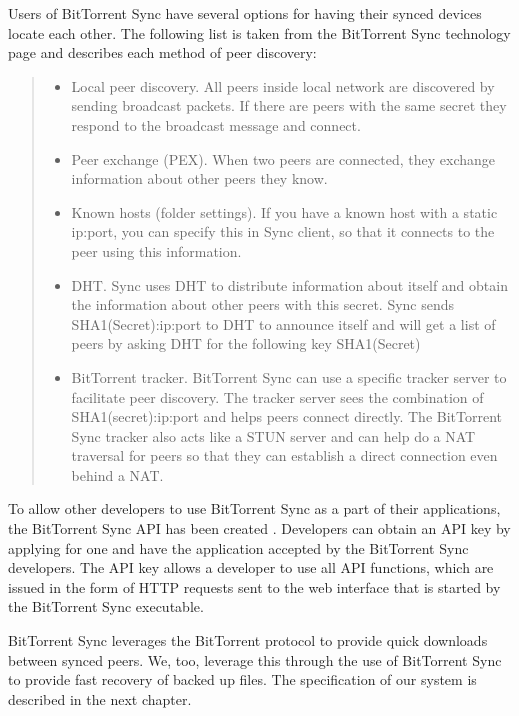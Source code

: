 \documentclass[12pt]{report}
\begin{document}
Users of BitTorrent Sync have several options for having their synced devices locate each other. The following list is taken from the BitTorrent Sync technology page \cite{btsynctech} and describes each method of peer discovery:

\begin{quote}
\begin{itemize}
\item Local peer discovery. All peers inside local network are discovered by sending broadcast packets. If there are peers with the same secret they respond to the broadcast message and connect.
\item Peer exchange (PEX). When two peers are connected, they exchange information about other peers they know.
\item Known hosts (folder settings). If you have a known host with a static ip:port, you can specify this in Sync client, so that it connects to the peer using this information.
\item DHT. Sync uses DHT to distribute information about itself and obtain the information about other peers with this secret. Sync sends SHA1(Secret):ip:port to DHT to announce itself and will get a list of peers by asking DHT for the following key SHA1(Secret)
\item BitTorrent tracker. BitTorrent Sync can use a specific tracker server to facilitate peer discovery. The tracker server sees the combination of SHA1(secret):ip:port and helps peers connect directly. The BitTorrent Sync tracker also acts like a STUN server and can help do a NAT traversal for peers so that they can establish a direct connection even behind a NAT.
\end{itemize}
\end{quote}

To allow other developers to use BitTorrent Sync as a part of their applications, the BitTorrent Sync API has been created \cite{btsyncapi}. Developers can obtain an API key by applying for one and have the application accepted by the BitTorrent Sync developers. The API key allows a developer to use all API functions, which are issued in the form of HTTP requests sent to the web interface that is started by the BitTorrent Sync executable.

BitTorrent Sync leverages the BitTorrent protocol to provide quick downloads between synced peers. We, too, leverage this through the use of BitTorrent Sync to provide fast recovery of backed up files. The specification of our system is described in the next chapter.
\end{document}
